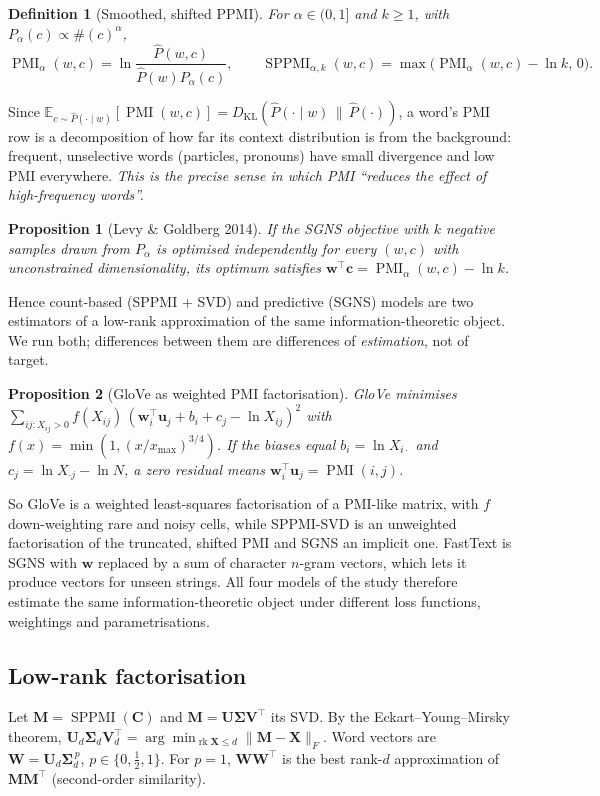 \documentclass[11pt,a4paper]{article}
\newtheorem{definition}{Definition}
\newtheorem{proposition}{Proposition}
\theoremstyle{remark}\newtheorem{remark}{Remark}
\newcommand{\cnt}{\#}                   %
\newcommand{\E}{\mathbb{E}}
\newcommand{\PMI}{\operatorname{PMI}}
\newcommand{\SPPMI}{\operatorname{SPPMI}}
\renewcommand{\v}[1]{\bm{#1}}           %
\begin{document}
\begin{definition}[Smoothed, shifted PPMI]
For $\alpha\in(0,1]$ and $k\ge1$, with $P_\alpha(c)\propto\cnt(c)^\alpha$,
\[
\PMI_\alpha(w,c)=\ln\frac{\hat P(w,c)}{\hat P(w)P_\alpha(c)},\qquad
\SPPMI_{\alpha,k}(w,c)=\max\bigl(\PMI_\alpha(w,c)-\ln k,\,0\bigr).
\]
\end{definition}
Since $\E_{c\sim\hat P(\cdot\mid w)}[\PMI(w,c)] = D_{\mathrm{KL}}(\hat P(\cdot\mid
w)\,\|\,\hat P(\cdot))$, a word's PMI row is a decomposition of how far its
context distribution is from the background: frequent, unselective words
(particles, pronouns) have small divergence and low PMI everywhere. \emph{This
is the precise sense in which PMI ``reduces the effect of high-frequency
words''.}

\begin{proposition}[Levy \& Goldberg 2014]
If the SGNS objective with $k$ negative samples drawn from $P_\alpha$ is
optimised independently for every $(w,c)$ with unconstrained dimensionality,
its optimum satisfies $\v{w}^\top\v{c} = \PMI_\alpha(w,c)-\ln k$.
\end{proposition}
\noindent Hence count-based (SPPMI + SVD) and predictive (SGNS) models are two
estimators of a low-rank approximation of the same information-theoretic
object. We run both; differences between them are differences of
\emph{estimation}, not of target.

\begin{proposition}[GloVe as weighted PMI factorisation]
GloVe minimises $\sum_{ij:X_{ij}>0} f(X_{ij})\,(\v{w}_i^\top\v{u}_j+b_i+c_j-\ln
X_{ij})^2$ with $f(x)=\min(1,(x/x_{\max})^{3/4})$. If the biases equal
$b_i=\ln X_{i\cdot}$ and $c_j=\ln X_{\cdot j}-\ln N$, a zero residual means
$\v{w}_i^\top\v{u}_j=\PMI(i,j)$.
\end{proposition}
\noindent So GloVe is a weighted least-squares factorisation of a PMI-like
matrix, with $f$ down-weighting rare and noisy cells, while SPPMI-SVD is an
unweighted factorisation of the truncated, shifted PMI and SGNS an implicit
one. FastText is SGNS with $\v{w}$ replaced by a sum of character $n$-gram
vectors, which lets it produce vectors for unseen strings. All four models of
the study therefore estimate the same information-theoretic object under
different loss functions, weightings and parametrisations.

\subsection{Low-rank factorisation}
Let $\v{M}=\SPPMI(\v{C})$ and $\v{M}=\v{U}\v{\Sigma}\v{V}^\top$ its SVD. By the
Eckart--Young--Mirsky theorem,
$\v{U}_d\v{\Sigma}_d\v{V}_d^\top=\arg\min_{\operatorname{rk}\v{X}\le d}\|\v{M}-\v{X}\|_F$.
Word vectors are $\v{W}=\v{U}_d\v{\Sigma}_d^{\,p}$, $p\in\{0,\tfrac12,1\}$.
For $p=1$, $\v{W}\v{W}^\top$ is the best rank-$d$ approximation of
$\v{M}\v{M}^\top$ (second-order similarity).
\end{document}
